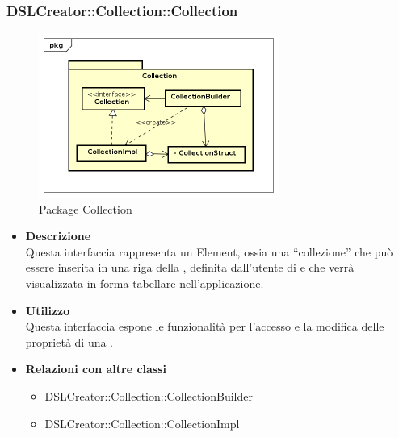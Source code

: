  \subsubsection{DSLCreator::Collection::Collection}
 \begin{figure}[H]
   \centering
   \includegraphics[width=0.7\textwidth]{res/img/Collection.png}
   \caption{Package Collection}
   \label{fig:diagram_model}
 \end{figure}
                    \begin{itemize}
                        \item \textbf{Descrizione} \hfill \\
                            Questa interfaccia rappresenta un  Element, ossia una ``collezione'' che può essere inserita in una riga della , definita dall'utente di  e che verrà visualizzata in forma tabellare nell'applicazione.
                        \item \textbf{Utilizzo} \hfill \\
                            Questa interfaccia espone le funzionalità per l'accesso e la modifica delle proprietà di una .
                        \item \textbf{Relazioni con altre classi}
                            \begin{itemize}
                              \item DSLCreator::Collection::CollectionBuilder
                              \item DSLCreator::Collection::CollectionImpl
                            \end{itemize}
                    \end{itemize}

